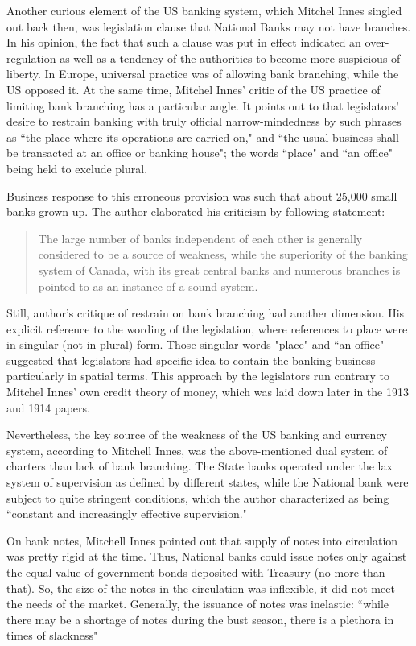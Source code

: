 Another curious element of the US banking system, which Mitchel Innes singled out back then, was legislation clause that National Banks may not have branches. In his opinion, the fact that such a clause was put in effect indicated an over-regulation as well as a tendency of the authorities to become more suspicious of liberty. In Europe, universal practice was of allowing bank branching, while the US opposed it. At the same time, Mitchel Innes' critic of the US practice of limiting bank branching has a particular angle. It points out to that legislators' desire to restrain banking with truly official narrow-mindedness by such phrases as ``the place where its operations are carried on," and ``the usual business shall be transacted at an office or banking house"; the words ``place" and ``an office" being held to exclude plural.

Business response to this erroneous provision was such that about 25,000 small banks grown up. The author elaborated his criticism by following statement:

\begin{quote}
The large number of banks independent of each other is generally considered to be a source of weakness, while the superiority of the banking system of Canada, with its great central banks and numerous branches is pointed to as an instance of a sound system. \citep{innes1910}
\end{quote}

Still, author's critique of restrain on bank branching had another dimension. His explicit reference to the wording of the legislation, where references to place were in singular (not in plural) form. Those singular words-"place" and ``an office"-suggested that legislators had specific idea to contain the banking business particularly in spatial terms. This approach by the legislators run contrary to Mitchel Innes' own credit theory of money, which was laid down later in the 1913 and 1914 papers. 

Nevertheless, the key source of the weakness of the US banking and currency system, according to Mitchell Innes, was the above-mentioned dual system of charters than lack of bank branching. The State banks operated under the lax system of supervision as defined by different states, while the National bank were subject to quite stringent conditions, which the author characterized as being ``constant and increasingly effective supervision."

On bank notes, Mitchell Innes pointed out that supply of notes into circulation was pretty rigid at the time. Thus, National banks could issue notes only against the equal value of government bonds deposited with Treasury (no more than that). So, the size of the notes in the circulation was inflexible, it did not meet the needs of the market. Generally, the issuance of notes was inelastic: ``while there may be a shortage of notes during the bust season, there is a plethora in times of slackness"

